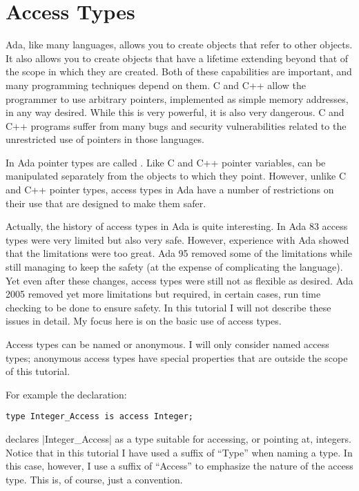 \section{Access Types}

Ada, like many languages, allows you to create objects that refer to other objects. It also
allows you to create objects that have a lifetime extending beyond that of the scope in which
they are created. Both of these capabilities are important, and many programming techniques
depend on them. C and C++ allow the programmer to use arbitrary pointers, implemented as simple
memory addresses, in any way desired. While this is very powerful, it is also very dangerous. C
and C++ programs suffer from many bugs and security vulnerabilities related to the unrestricted
use of pointers in those languages.

In Ada pointer types are called . Like C and C++ pointer variables,
 can be manipulated separately from the objects to which they point.
However, unlike C and C++ pointer types, access types in Ada have a number of restrictions on
their use that are designed to make them safer.

Actually, the history of access types in Ada is quite interesting. In Ada 83 access types were
very limited but also very safe. However, experience with Ada showed that the limitations were
too great. Ada 95 removed some of the limitations while still managing to keep the safety (at
the expense of complicating the language). Yet even after these changes, access types were still
not as flexible as desired. Ada 2005 removed yet more limitations but required, in certain
cases, run time checking to be done to ensure safety. In this tutorial I will not describe these
issues in detail. My focus here is on the basic use of access types.

Access types can be named or anonymous. I will only consider named access types; anonymous
access types have special properties that are outside the scope of this tutorial.

For example the declaration:

\begin{lstlisting}
type Integer_Access is access Integer;
\end{lstlisting}

\noindent declares |Integer_Access| as a type suitable for accessing, or pointing at, integers.
Notice that in this tutorial I have used a suffix of ``Type'' when naming a type. In this case,
however, I use a suffix of ``Access'' to emphasize the nature of the access type. This is, of
course, just a convention.

